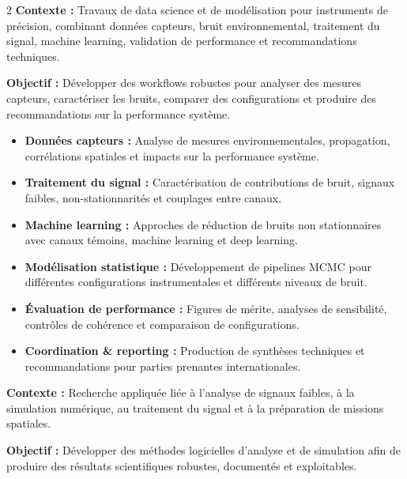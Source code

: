 \documentclass[8pt,a4paper,ragged2e,withhyper]{altacv}
\begin{document}
\begin{paracol}{2}
\textbf{Contexte :} Travaux de data science et de modélisation pour instruments de précision, combinant données capteurs, bruit environnemental, traitement du signal, machine learning, validation de performance et recommandations techniques.

\textbf{Objectif :} Développer des workflows robustes pour analyser des mesures capteurs, caractériser les bruits, comparer des configurations et produire des recommandations sur la performance système.

\begin{itemize}
  \item \textbf{Données capteurs :} Analyse de mesures environnementales, propagation, corrélations spatiales et impacts sur la performance système.
  \item \textbf{Traitement du signal :} Caractérisation de contributions de bruit, signaux faibles, non-stationnarités et couplages entre canaux.
  \item \textbf{Machine learning :} Approches de réduction de bruits non stationnaires avec canaux témoins, machine learning et deep learning.
  \item \textbf{Modélisation statistique :} Développement de pipelines MCMC pour différentes configurations instrumentales et différents niveaux de bruit.
  \item \textbf{Évaluation de performance :} Figures de mérite, analyses de sensibilité, contrôles de cohérence et comparaison de configurations.
  \item \textbf{Coordination \& reporting :} Production de synthèses techniques et recommandations pour parties prenantes internationales.
\end{itemize}

\divider


\textbf{Contexte :} Recherche appliquée liée à l’analyse de signaux faibles, à la simulation numérique, au traitement du signal et à la préparation de missions spatiales.

\textbf{Objectif :} Développer des méthodes logicielles d’analyse et de simulation afin de produire des résultats scientifiques robustes, documentés et exploitables.


\end{paracol}
\end{document}
